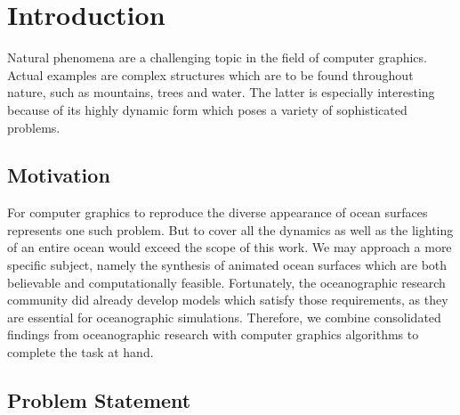 \chapter{Introduction}
\label{ch:intro}
%
Natural phenomena are a challenging topic in the field of computer graphics.
Actual examples are complex structures which are to be found throughout nature,
such as mountains, trees and water. The latter is especially interesting
because of its highly dynamic form which poses a variety of sophisticated problems.
\section{Motivation}
\label{sec:motivation}
For computer graphics to reproduce the diverse appearance of ocean surfaces
represents one such problem. But to cover all the dynamics as well
as the lighting of an entire ocean would exceed the scope of this work.
We may approach a more specific subject, namely the synthesis of animated ocean
surfaces which are both believable and computationally feasible.
Fortunately, the oceanographic research community did already develop models
which satisfy those requirements, as they are essential for oceanographic
simulations. Therefore, we combine consolidated findings from oceanographic
research with computer graphics algorithms to complete the task at hand.




% 
% 
% 

\section{Problem Statement}
\label{sec:problem_statement}

